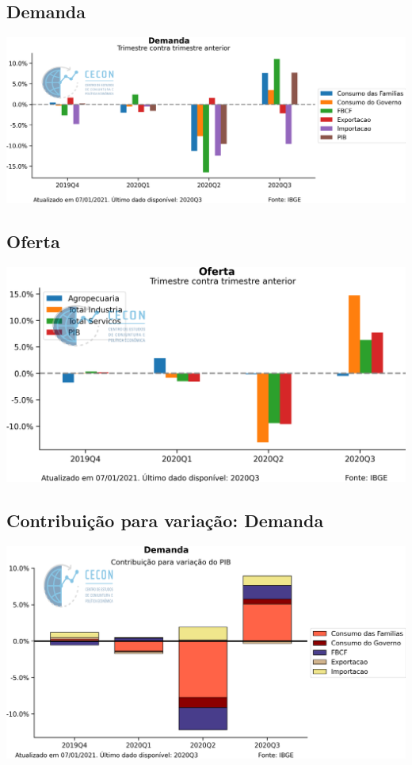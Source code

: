 \documentclass{SelfArx}
\begin{document}
\subsection*{Demanda}
\label{sec:org77c4ad7}

\begin{center}
\includegraphics[width=.9\linewidth]{./figs/PIB/Demanda.png}
\end{center}

\subsection*{Oferta}
\label{sec:org07dfd94}


\begin{center}
\includegraphics[width=.9\linewidth]{./figs/PIB/Oferta.png}
\end{center}


\subsection*{Contribuição para variação: Demanda}
\label{sec:orgbdd5490}

\begin{center}
\includegraphics[width=.9\linewidth]{./figs/PIB/Contrib_Demanda.png}
\end{center}
\end{document}
